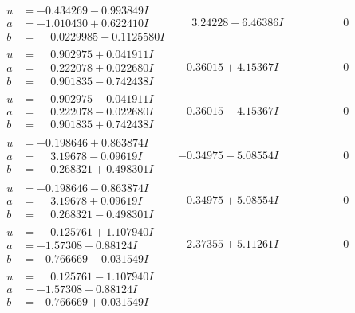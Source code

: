 \documentclass[1p]{elsarticle_modified}
\theoremstyle{definition}
\begin{document}
$$\begin{array}{c|c|c}
\begin{aligned}
u &= -0.434269 - 0.993849 I \\
a &= -1.010430 + 0.622410 I \\
b &= \phantom{-}0.0229985 - 0.1125580 I\end{aligned}
 & \phantom{-}3.24228 + 6.46386 I & \phantom{-0.000000 } 0 \\ \hline\begin{aligned}
u &= \phantom{-}0.902975 + 0.041911 I \\
a &= \phantom{-}0.222078 + 0.022680 I \\
b &= \phantom{-}0.901835 - 0.742438 I\end{aligned}
 & -0.36015 + 4.15367 I & \phantom{-0.000000 } 0 \\ \hline\begin{aligned}
u &= \phantom{-}0.902975 - 0.041911 I \\
a &= \phantom{-}0.222078 - 0.022680 I \\
b &= \phantom{-}0.901835 + 0.742438 I\end{aligned}
 & -0.36015 - 4.15367 I & \phantom{-0.000000 } 0 \\ \hline\begin{aligned}
u &= -0.198646 + 0.863874 I \\
a &= \phantom{-}3.19678 - 0.09619 I \\
b &= \phantom{-}0.268321 + 0.498301 I\end{aligned}
 & -0.34975 - 5.08554 I & \phantom{-0.000000 } 0 \\ \hline\begin{aligned}
u &= -0.198646 - 0.863874 I \\
a &= \phantom{-}3.19678 + 0.09619 I \\
b &= \phantom{-}0.268321 - 0.498301 I\end{aligned}
 & -0.34975 + 5.08554 I & \phantom{-0.000000 } 0 \\ \hline\begin{aligned}
u &= \phantom{-}0.125761 + 1.107940 I \\
a &= -1.57308 + 0.88124 I \\
b &= -0.766669 - 0.031549 I\end{aligned}
 & -2.37355 + 5.11261 I & \phantom{-0.000000 } 0 \\ \hline\begin{aligned}
u &= \phantom{-}0.125761 - 1.107940 I \\
a &= -1.57308 - 0.88124 I \\
b &= -0.766669 + 0.031549 I\end{aligned}

\end{array}$$
\end{document}

